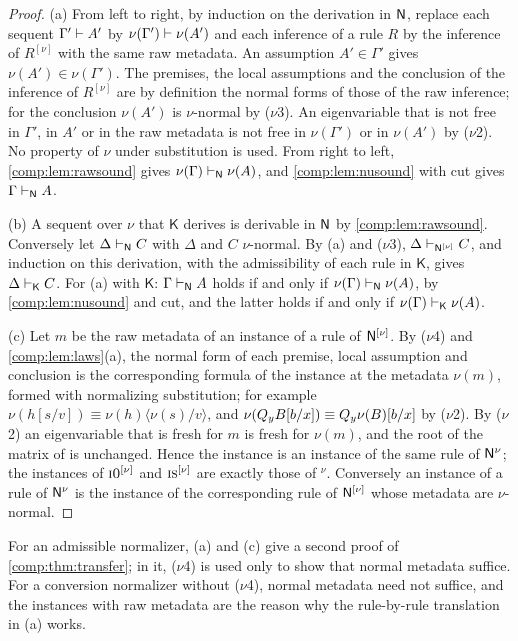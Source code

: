 \begin{proof}
(a) From left to right, by induction on the derivation in $\mathsf{N}$, replace
each sequent $\Gamma'\vdash A'$ by $\nu(\Gamma')\vdash\nu(A')$ and each
inference of a rule $R$ by the inference of $R^{[\nu]}$ with the same raw
metadata. An assumption $A'\in\Gamma'$ gives $\nu(A')\in\nu(\Gamma')$. The
premises, the local assumptions and the conclusion of the inference of
$R^{[\nu]}$ are by definition the normal forms of those of the raw
inference; for  the conclusion $\nu(A')$ is $\nu$-normal by
($\nu$3). An eigenvariable that is not free in $\Gamma'$, in $A'$ or in the
raw metadata is not free in $\nu(\Gamma')$ or in $\nu(A')$ by ($\nu$2). No
property of $\nu$ under substitution is used. From right to left,
\cref{comp:lem:rawsound} gives $\nu(\Gamma)\vdash_{\mathsf{N}}\nu(A)$, and
\cref{comp:lem:nusound} with cut gives $\Gamma\vdash_{\mathsf{N}}A$.

(b) A sequent over $\nu$ that $\mathsf K$ derives is derivable in $\mathsf{N}$ by
\cref{comp:lem:rawsound}. Conversely let $\Delta\vdash_{\mathsf{N}}C$ with
$\Delta$ and $C$ $\nu$-normal. By (a) and ($\nu$3),
$\Delta\vdash_{\mathsf{N}^{[\nu]}}C$, and induction on this derivation, with the
admissibility of each rule in $\mathsf K$, gives $\Delta\vdash_{\mathsf K}C$.
For (a) with $\mathsf K$: $\Gamma\vdash_{\mathsf{N}}A$ holds if and only if
$\nu(\Gamma)\vdash_{\mathsf{N}}\nu(A)$, by \cref{comp:lem:nusound} and cut, and
the latter holds if and only if $\nu(\Gamma)\vdash_{\mathsf K}\nu(A)$.

(c) Let $m$ be the raw metadata of an instance of a rule of $\mathsf{N}^{[\nu]}$.
By ($\nu$4) and \cref{comp:lem:laws}(a), the normal form of each premise,
local assumption and conclusion is the corresponding formula of the instance
at the metadata $\nu(m)$, formed with normalizing substitution; for example
$\nu(h[s/v])\equiv\nu(h)\langle\nu(s)/v\rangle$, and
$\nu(Q_{y}B[b/x])\equiv Q_{y}\nu(B)[b/x]$ by ($\nu$2). By ($\nu$2) an
eigenvariable that is fresh for $m$ is fresh for $\nu(m)$, and the root of
the matrix of  is unchanged. Hence the instance is an instance of
the same rule of $\mathsf{N}^{\nu}$; the instances of $\rulename{I0}^{[\nu]}$ and
$\rulename{IS}^{[\nu]}$ are exactly those of $^{\nu}$.
Conversely an instance of a rule of $\mathsf{N}^{\nu}$ is the instance of the
corresponding rule of $\mathsf{N}^{[\nu]}$ whose metadata are $\nu$-normal.
\end{proof}

For an admissible normalizer, (a) and (c) give a second proof of
\cref{comp:thm:transfer}; in it, ($\nu$4) is used only to show that normal
metadata suffice. For a conversion normalizer without ($\nu$4), normal
metadata need not suffice, and the instances with raw metadata are the
reason why the rule-by-rule translation in (a) works.

